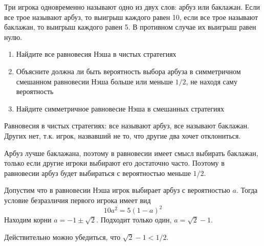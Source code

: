 \begin{problem}
Три игрока одновременно называют одно из двух слов: арбуз или баклажан. Если все трое называют арбуз, то выигрыш каждого равен 10, если все трое называют баклажан, то  выигрыш каждого равен 5. В противном случае их выигрыш равен нулю.
\begin{enumerate}
\item Найдите все равновесия Нэша в чистых стратегиях
\item Объясните должна ли быть вероятность выбора арбуза в симметричном смешанном равновесии Нэша больше или меньше $1/2$, не находя саму вероятность
\item Найдите симметричное равновесие  Нэша в смешанных стратегиях
\end{enumerate}


\begin{sol}
Равновесия в чистых стратегиях: все называют арбуз, все называют баклажан. Других нет, т.к. игрок, назвавший не то, что другие два хочет отклониться.

Арбуз лучше баклажана, поэтому в равновесии имеет смысл выбирать баклажан, только если другие игроки выбирают его достаточно часто. Поэтому в равновесии арбуз будет выбираться  с вероятностью меньше $1/2$.

Допустим что в равновесии Нэша игрок выбирает арбуз с вероятностью $a$. Тогда условие безразличия первого игрока имеет вид
\[
10 a^2 = 5(1-a)^2
\]
Находим корни $a=-1\pm \sqrt{2}$. Подходит только один, $a=\sqrt{2}-1$.

Действительно можно убедиться, что $\sqrt{2}-1<1/2$.
\end{sol}
\end{problem}



